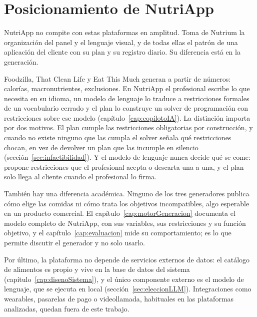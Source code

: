 \section{Posicionamiento de NutriApp}
\label{sec:posicionamiento}

NutriApp no compite con estas plataformas en amplitud. Toma de Nutrium la organización del panel y el lenguaje visual, y de todas ellas el patrón de una aplicación del cliente con su plan y su registro diario. Su diferencia está en la generación.

Foodzilla, That Clean Life y Eat This Much generan a partir de números: calorías, macronutrientes, exclusiones. En NutriApp el profesional escribe lo que necesita en su idioma, un modelo de lenguaje lo traduce a restricciones formales de un vocabulario cerrado y el plan lo construye un solver de programación con restricciones sobre ese modelo (capítulo~\ref{cap:copilotoIA}). La distinción importa por dos motivos. El plan cumple las restricciones obligatorias por construcción, y cuando no existe ninguno que las cumpla el solver señala qué restricciones chocan, en vez de devolver un plan que las incumple en silencio (sección~\ref{sec:infactibilidad}). Y el modelo de lenguaje nunca decide qué se come: propone restricciones que el profesional acepta o descarta una a una, y el plan solo llega al cliente cuando el profesional lo firma.

También hay una diferencia académica. Ninguno de los tres generadores publica cómo elige las comidas ni cómo trata los objetivos incompatibles, algo esperable en un producto comercial. El capítulo~\ref{cap:motorGeneracion} documenta el modelo completo de NutriApp, con sus variables, sus restricciones y su función objetivo, y el capítulo~\ref{cap:evaluacion} mide su comportamiento; es lo que permite discutir el generador y no solo usarlo.

Por último, la plataforma no depende de servicios externos de datos: el catálogo de alimentos es propio y vive en la base de datos del sistema (capítulo~\ref{cap:disenoSistema}), y el único componente externo es el modelo de lenguaje, que se ejecuta en local (sección~\ref{sec:eleccionLLM}). Integraciones como wearables, pasarelas de pago o videollamada, habituales en las plataformas analizadas, quedan fuera de este trabajo.
